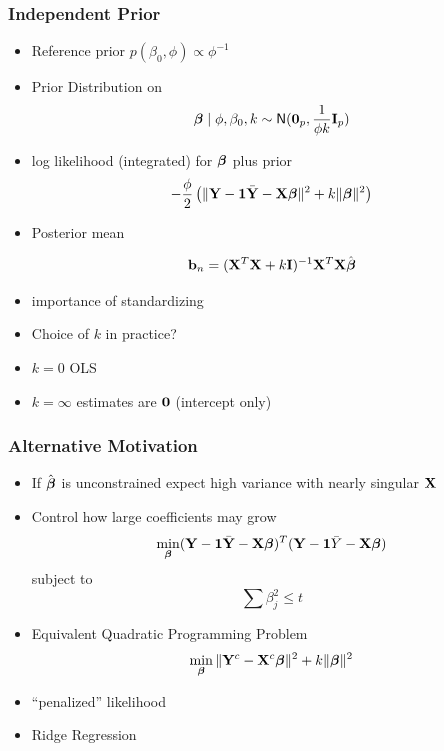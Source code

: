 \documentclass{beamer}\usepackage[]{graphicx}\usepackage[]{color}
\begin{document}
\begin{frame}
  \frametitle{Independent Prior}
  \begin{itemize}
  \item Reference prior $p(\beta_0, \phi) \propto \phi^{-1}$
  \item
  Prior Distribution on $$\boldsymbol{\beta} \mid \phi, \beta_0, k \sim \textsf{N}(\mathbf{0}_p, \frac{1}{ \phi
    k} \mathbf{I}_p)$$ \pause

\item log likelihood (integrated) for $\boldsymbol{\beta}$ plus prior
$$- \frac{\phi}{2}\left(\| \mathbf{Y} - \mathbf{1} \bar{\mathbf{Y}} - \mathbf{X} \boldsymbol{\beta} \|^2  + k \| \boldsymbol{\beta} \|^2    \right)$$
\item  Posterior mean


  $$\mathbf{b}_n = (\mathbf{X}^T\mathbf{X} + k \mathbf{I})^{-1}  \mathbf{X}^T\mathbf{X} \hat{\boldsymbol{\beta}}$$ \pause
\item importance of standardizing \pause

\item Choice of $k$ in practice?
\item $k = 0$ OLS
\item $k = \infty$  estimates are $\mathbf{0}$   (intercept only)
  \end{itemize}
\end{frame}

\begin{frame}  \frametitle{Alternative Motivation}
  \begin{itemize}
  \item If  $\hat{\boldsymbol{\beta}}$ is unconstrained  expect high variance with nearly
    singular $\mathbf{X}$ \pause

\item Control how large coefficients may grow \pause
    $$\min_{\boldsymbol{\beta}} (\mathbf{Y} - \mathbf{1} \bar{\mathbf{Y}}  - \mathbf{X} \boldsymbol{\beta})^T (\mathbf{Y} -\mathbf{1} \bar{Y}  - \mathbf{X}\boldsymbol{\beta})$$
    subject to
    $$ \sum \beta_j^2 \le t$$ \pause
  \item Equivalent Quadratic Programming Problem
    $$\min_{\boldsymbol{\beta}} \| \mathbf{Y}^c - \mathbf{X}^c \boldsymbol{\beta}\|^2 + k \|\boldsymbol{\beta}\|^2$$ \pause
  \item ``penalized'' likelihood  \pause
  \item Ridge Regression
  \end{itemize}
\end{frame}
\end{document}
